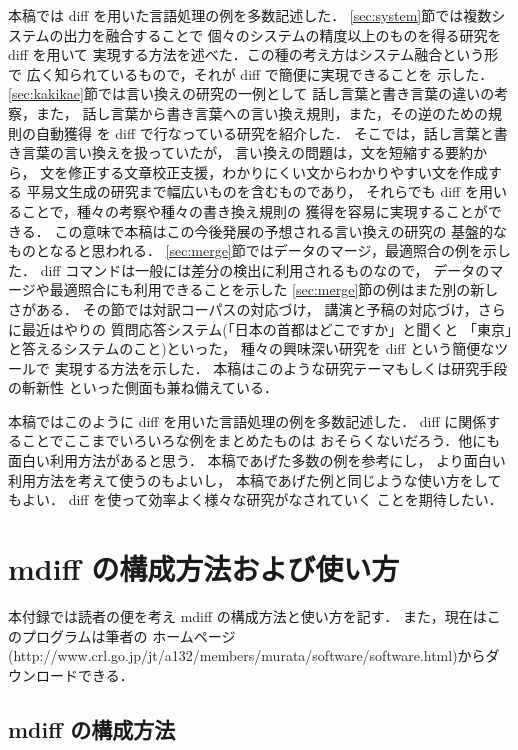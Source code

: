 本稿では diff を用いた言語処理の例を多数記述した．
\ref{sec:system}節では複数システムの出力を融合することで
個々のシステムの精度以上のものを得る研究を diff を用いて
実現する方法を述べた．この種の考え方はシステム融合という形で
広く知られているもので，それが diff で簡便に実現できることを
示した．\ref{sec:kakikae}節では言い換えの研究の一例として
話し言葉と書き言葉の違いの考察，また，
話し言葉から書き言葉への言い換え規則，また，その逆のための規則の自動獲得
を diff で行なっている研究を紹介した．
そこでは，話し言葉と書き言葉の言い換えを扱っていたが，
言い換えの問題は，文を短縮する要約から，
文を修正する文章校正支援，わかりにくい文からわかりやすい文を作成する
平易文生成の研究まで幅広いものを含むものであり，
それらでも diff を用いることで，種々の考察や種々の書き換え規則の
獲得を容易に実現することができる．
この意味で本稿はこの今後発展の予想される言い換えの研究の
基盤的なものとなると思われる．
\ref{sec:merge}節ではデータのマージ，最適照合の例を示した．
diff コマンドは一般には差分の検出に利用されるものなので，
データのマージや最適照合にも利用できることを示した
\ref{sec:merge}節の例はまた別の新しさがある．
その節では対訳コーパスの対応づけ，
講演と予稿の対応づけ，さらに最近はやりの
質問応答システム(「日本の首都はどこですか」と聞くと
「東京」と答えるシステムのこと)といった，
種々の興味深い研究を diff という簡便なツールで
実現する方法を示した．
本稿はこのような研究テーマもしくは研究手段の斬新性
といった側面も兼ね備えている．

本稿ではこのように diff を用いた言語処理の例を多数記述した．
diff に関係することでここまでいろいろな例をまとめたものは
おそらくないだろう．他にも面白い利用方法があると思う．
本稿であげた多数の例を参考にし，
より面白い利用方法を考えて使うのもよいし，
本稿であげた例と同じような使い方をしてもよい．
diff を使って効率よく様々な研究がなされていく
ことを期待したい．

\appendix
\section{mdiff の構成方法および使い方}\label{sec:exp_mdiff}

本付録では読者の便を考え mdiff の構成方法と使い方を記す．
また，現在はこのプログラムは筆者の
ホームページ(http://www.crl.go.jp/jt/a132/members/murata/software/software.html)からダウンロードできる．

\subsection{mdiff の構成方法}\label{sec:make_mdiff}

